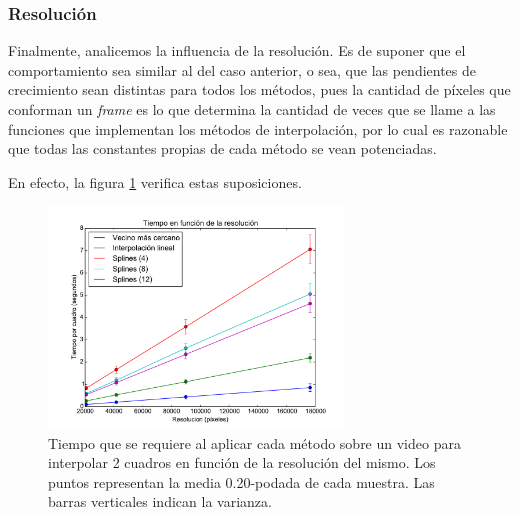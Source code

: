 \subsubsection{Resolución}
Finalmente, analicemos la influencia de la resolución. Es de suponer que el comportamiento sea similar al del caso anterior, o sea, que las pendientes de crecimiento sean distintas para todos los métodos, pues la cantidad de píxeles que conforman un \emph{frame} es lo que determina la cantidad de veces que se llame a las funciones que implementan los métodos de interpolación, por lo cual es razonable que todas las constantes propias de cada método se vean potenciadas.

En efecto, la figura \ref{fig:times-resolucion} verifica estas suposiciones.  

\begin{figure}[H]
 \centering
	\includegraphics[width=0.7\textwidth]{imgs/resultados_tiempos/resolucion.pdf}
	\caption{\footnotesize Tiempo que se requiere al aplicar cada método sobre un video para interpolar 2 cuadros en función de la resolución del mismo. Los puntos representan la media 0.20-podada de cada muestra. Las barras verticales indican la varianza.}
	\label{fig:times-resolucion}
\end{figure}